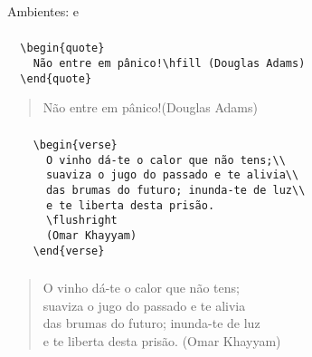 \begin{frame}[standout]
  \Huge
\end{frame}

\begin{frame}
  \frametitle{}
  \Huge
  Ambientes:  e 
\end{frame}

\begin{frame}[fragile]
  \frametitle{}
  \Large
  \begin{verbatim}
  \begin{quote}
    Não entre em pânico!\hfill (Douglas Adams)
  \end{quote}
  \end{verbatim}
  \vspace{1em}

  \begin{quote}
    Não entre em pânico!\hfill (Douglas Adams)
  \end{quote}
\end{frame}

\begin{frame}[fragile]
  \frametitle{}
  \begin{verbatim}
    \begin{verse}
      O vinho dá-te o calor que não tens;\\
      suaviza o jugo do passado e te alivia\\
      das brumas do futuro; inunda-te de luz\\
      e te liberta desta prisão.
      \flushright
      (Omar Khayyam)
    \end{verse}
  \end{verbatim}
\end{frame}

\begin{frame}
  \frametitle{}
  \Large
  \begin{verse}
    O vinho dá-te o calor que não tens;\\
    suaviza o jugo do passado e te alivia\\
    das brumas do futuro; inunda-te de luz\\
    e te liberta desta prisão.
    \flushright
    (Omar Khayyam)
  \end{verse}
\end{frame}
